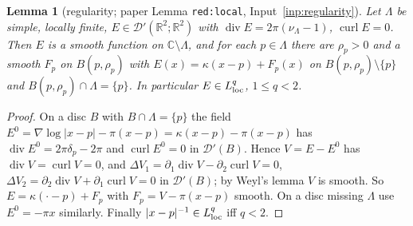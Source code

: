 \documentclass[11pt]{article}
\newtheorem{lemma}[theorem]{Lemma}
\theoremstyle{definition}
\theoremstyle{remark}
\newcommand{\R}{\mathbb R}
\newcommand{\C}{\mathbb C}
\newcommand{\Lam}{\Lambda}
\DeclareMathOperator{\Div}{div}
\begin{document}
\begin{lemma}[regularity; paper Lemma \texttt{red:local}, Input~\ref{inp:regularity}]\label{lem:regularity}
Let $\Lam$ be simple, locally finite, $E\in\mathcal D'(\R^2;\R^2)$ with $\Div E=2\pi(\nu_\Lam-1)$, $\operatorname{curl}E=0$.
Then $E$ is a smooth function on $\C\setminus\Lam$, and for each $p\in\Lam$ there are $\rho_p>0$ and a smooth
$F_p$ on $B(p,\rho_p)$ with $E(x)=\kappa(x-p)+F_p(x)$ on $B(p,\rho_p)\setminus\{p\}$ and
$B(p,\rho_p)\cap\Lam=\{p\}$.  In particular $E\in L^q_{\rm loc}$, $1\le q<2$.
\end{lemma}
\begin{proof}
On a disc $B$ with $B\cap\Lam=\{p\}$ the field $E^0=\nabla\log|x-p|-\pi(x-p)=\kappa(x-p)-\pi(x-p)$ has $\Div E^0=2\pi\delta_p-2\pi$
and $\operatorname{curl}E^0=0$ in $\mathcal D'(B)$.  Hence $V=E-E^0$ has $\Div V=\operatorname{curl}V=0$, and
$\Delta V_1=\partial_1\Div V-\partial_2\operatorname{curl}V=0$, $\Delta V_2=\partial_2\Div V+\partial_1\operatorname{curl}V=0$ in $\mathcal D'(B)$; by
Weyl's lemma $V$ is smooth.  So $E=\kappa(\cdot-p)+F_p$ with $F_p=V-\pi(x-p)$ smooth.  On a disc missing $\Lam$ use
$E^0=-\pi x$ similarly.  Finally $|x-p|^{-1}\in L^q_{\rm loc}$ iff $q<2$.
\end{proof}
\end{document}
